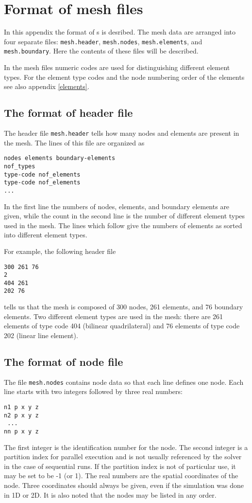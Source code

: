 \chapter{Format of mesh files}
\label{ch:meshformat}

In this appendix the format of s is desribed.
The mesh data are arranged into four separate files: {\tt mesh.header},
{\tt mesh.nodes}, {\tt mesh.elements}, and {\tt mesh.boundary}.
Here the contents of these files will be described.

In the mesh files numeric codes are used for distinguishing  
different element types. For the element type codes and the node numbering order 
of the elements see also appendix \ref{elements}.


\section{The format of header file}

The header file {\tt mesh.header} tells how many nodes and elements
are present in the mesh. The lines of this file are organized as
\begin{verbatim}
nodes elements boundary-elements
nof_types
type-code nof_elements
type-code nof_elements
...
\end{verbatim}
In the first line the numbers of nodes, elements, and
boundary elements are given, while the count in the second line is
the number of different element types used in the mesh. 
The lines which follow give the numbers of elements 
as sorted into different element types.

For example, the following header file
\begin{verbatim}
300 261 76
2
404 261
202 76
\end{verbatim}
tells us that the mesh is composed of 300 nodes, 261 elements, and 
76 boundary elements. Two different element types are used in the mesh:
there are 261 elements of type code 404 (bilinear quadrilateral) and 
76 elements of type code 202 (linear line element).


\section{The format of node file}

The file {\tt mesh.nodes} contains node data so that each line defines 
one node. Each line starts with two integers followed by three 
real numbers:
\begin{verbatim}
n1 p x y z
n2 p x y z
 ...
nn p x y z
\end{verbatim}
The first integer is the identification number for the node.
The second integer is a partition index for parallel execution and is 
not usually referenced by the solver in the case of sequential runs. If 
the partition index is not of particular use, it may be set to be
-1 (or 1). The real numbers are the spatial coordinates of the
node. Three coordinates should always be given, even if
the simulation was done in 1D or 2D. It 
is also noted that the nodes may be listed in any order.

